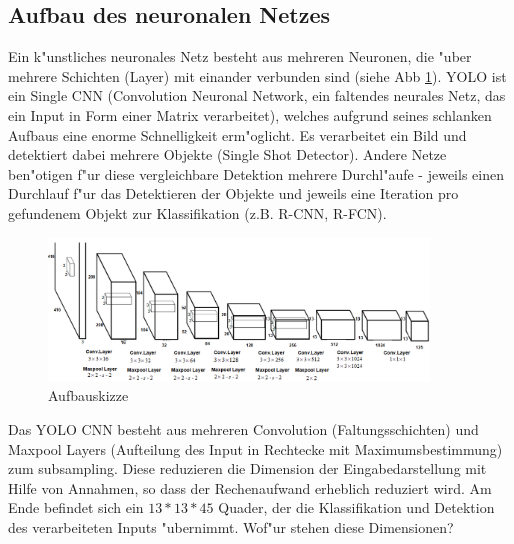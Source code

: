 \subsection{Aufbau des neuronalen Netzes}
\label{sec:cnn_aufbau}
Ein k"unstliches neuronales Netz besteht aus mehreren Neuronen, die "uber mehrere Schichten (Layer) mit einander verbunden sind (siehe Abb \ref{fig:neunet}). YOLO ist ein Single CNN (Convolution Neuronal Network, ein faltendes neurales Netz, das ein Input in Form einer Matrix verarbeitet),
welches aufgrund seines schlanken Aufbaus eine enorme Schnelligkeit erm"oglicht. Es verarbeitet ein Bild und detektiert dabei mehrere Objekte (Single Shot Detector). Andere Netze ben"otigen f"ur diese vergleichbare Detektion mehrere Durchl"aufe - jeweils einen Durchlauf f"ur das Detektieren der Objekte und jeweils eine Iteration pro gefundenem Objekt zur Klassifikation (z.B. R-CNN, R-FCN).

\begin{figure}[h]
	\centering
	\includegraphics[width=0.90\textwidth]{images/aufbauskizze}
	\caption{Aufbauskizze}
	\label{fig:neunet}
\end{figure}

Das YOLO CNN besteht aus mehreren Convolution (Faltungsschichten) und Maxpool Layers (Aufteilung des Input in Rechtecke mit Maximumsbestimmung) zum subsampling.
Diese reduzieren die Dimension der Eingabedarstellung mit Hilfe von Annahmen,
so dass der Rechenaufwand erheblich reduziert wird. Am Ende befindet sich ein $13*13*45$ Quader, der die Klassifikation und Detektion des verarbeiteten Inputs "ubernimmt. Wof"ur stehen diese Dimensionen?

